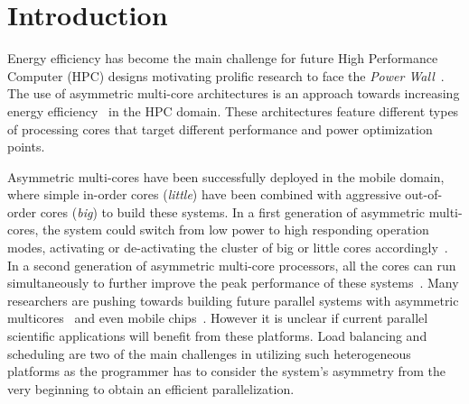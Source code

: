 
%
%
% 
\chapter{Introduction}
Energy efficiency has become the main challenge for future High Performance Computer (HPC) designs motivating prolific research to face the \textit{Power Wall}~\cite{Kogge_Exascale_TR08}.
The use of asymmetric multi-core architectures is an approach towards increasing energy efficiency~\cite{Fedorova2009,Greenhalgh2011,Kumar:ISCA2004,Balakrishnan:ISCA2005} in the HPC domain.
These architectures feature different types of processing cores that target different performance and power optimization points.



Asymmetric multi-cores have been successfully deployed in the mobile domain, where simple in-order cores (\emph{little}) have been combined with aggressive out-of-order cores (\emph{big}) to build these systems. In a first generation of asymmetric multi-cores, the system could switch from low power to high responding operation modes, activating or de-activating the cluster of big or little cores accordingly~\cite{ARM}. In a second generation of asymmetric multi-core processors, all the cores can run simultaneously to further improve the peak performance of these systems~\cite{samsung}.
Many researchers are pushing towards building future parallel systems with asymmetric multicores~\cite{Suleman:APLOS2009,Fedorova2009, Greenhalgh2011, Joao:ASPLOS2012,Joao:ISCA2013} and even mobile chips~\cite{ARM4HPC_SC13}. 
However it is unclear if current parallel scientific applications will benefit from these platforms.
Load balancing and scheduling are two of the main challenges in utilizing such heterogeneous platforms as the programmer has to consider the system's asymmetry from the very beginning to obtain an efficient parallelization. 

